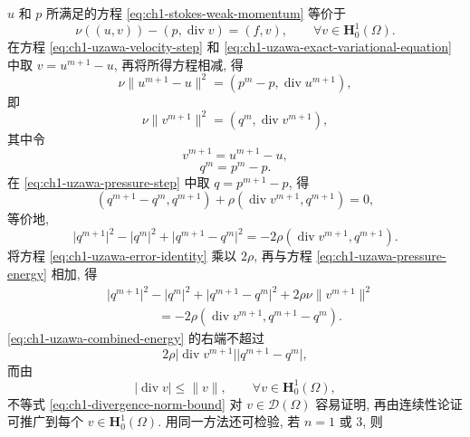 \begin{Proof}
$u$ 和 $p$ 所满足的方程 \eqref{eq:ch1-stokes-weak-momentum} 等价于
\begin{equation}
\nu((u,v))-(p,\operatorname{div}v)=(f,v),
\qquad \forall v\in\mathbf H_0^1(\Omega).
\label{eq:ch1-uzawa-exact-variational-equation}
\end{equation}
在方程 \eqref{eq:ch1-uzawa-velocity-step} 和 \eqref{eq:ch1-uzawa-exact-variational-equation} 中取 $v=u^{m+1}-u$, 再将所得方程相减, 得
\[
\nu\lVert u^{m+1}-u\rVert^2=(p^m-p,\operatorname{div}u^{m+1}),
\]
即
\begin{equation}
\nu\lVert v^{m+1}\rVert^2=(q^m,\operatorname{div}v^{m+1}),
\label{eq:ch1-uzawa-error-identity}
\end{equation}
其中令
\begin{equation}
v^{m+1}=u^{m+1}-u,
\label{eq:ch1-uzawa-velocity-error}
\end{equation}
\begin{equation}
q^m=p^m-p.
\label{eq:ch1-uzawa-pressure-error}
\end{equation}
在 \eqref{eq:ch1-uzawa-pressure-step} 中取 $q=p^{m+1}-p$, 得
\[
(q^{m+1}-q^m,q^{m+1})+\rho(\operatorname{div}v^{m+1},q^{m+1})=0,
\]
等价地,
\begin{equation}
\lvert q^{m+1}\rvert^2-\lvert q^m\rvert^2
+\lvert q^{m+1}-q^m\rvert^2
=-2\rho(\operatorname{div}v^{m+1},q^{m+1}).
\label{eq:ch1-uzawa-pressure-energy}
\end{equation}
将方程 \eqref{eq:ch1-uzawa-error-identity} 乘以 $2\rho$, 再与方程 \eqref{eq:ch1-uzawa-pressure-energy} 相加, 得
\begin{equation}
\begin{aligned}
&\lvert q^{m+1}\rvert^2-\lvert q^m\rvert^2
+\lvert q^{m+1}-q^m\rvert^2
+2\rho\nu\lVert v^{m+1}\rVert^2\\
&\hspace{4em}=-2\rho(\operatorname{div}v^{m+1},q^{m+1}-q^m).
\end{aligned}
\label{eq:ch1-uzawa-combined-energy}
\end{equation}
\eqref{eq:ch1-uzawa-combined-energy} 的右端不超过
\[
2\rho\lvert\operatorname{div}v^{m+1}\rvert\lvert q^{m+1}-q^m\rvert,
\]
而由
\begin{equation}
\lvert\operatorname{div}v\rvert\leq\lVert v\rVert,
\qquad \forall v\in\mathbf H_0^1(\Omega),
\label{eq:ch1-divergence-norm-bound}
\end{equation}
不等式 \eqref{eq:ch1-divergence-norm-bound} 对 $v\in\mathcal D(\Omega)$ 容易证明, 再由连续性论证可推广到每个 $v\in\mathbf H_0^1(\Omega)$. 用同一方法还可检验, 若 $n=1$ 或 $3$, 则

\end{Proof}
